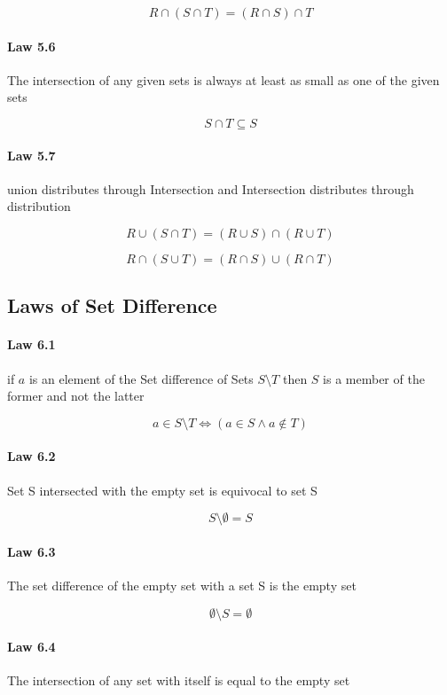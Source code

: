 \documentclass[twocolumn]{article}
\begin{document}
$$ R  \cap  (S  \cap  T) = (R  \cap  S)  \cap  T $$

\paragraph{Law 5.6} The intersection of any given sets is always at least as small as one of the given sets

$$ S \cap T \subseteq S $$

\paragraph{Law 5.7} union distributes through Intersection and Intersection distributes through distribution

$$ R  \cup  (S  \cap  T) = (R  \cup  S)  \cap  (R  \cup  T) $$

$$ R  \cap  (S  \cup  T) = (R  \cap  S)  \cup  (R  \cap  T) $$

\subsection{Laws of Set Difference}

\paragraph{Law 6.1} if $a$ is an element of the Set difference of Sets $S \setminus T$ then $S$ is a member of the former and not the latter

$$ a  \in  S \setminus T \iff (a  \in  S \wedge a \not\in T) $$

\paragraph{Law 6.2} Set S intersected with the empty set is equivocal to set S

$$ S \setminus \emptyset  = S  $$

\paragraph{Law 6.3} The set difference of the empty set with a set S is the empty set

$$  \emptyset \setminus S =  \emptyset  $$

\paragraph{Law 6.4} The intersection of any set with itself is equal to the empty set
\end{document}
